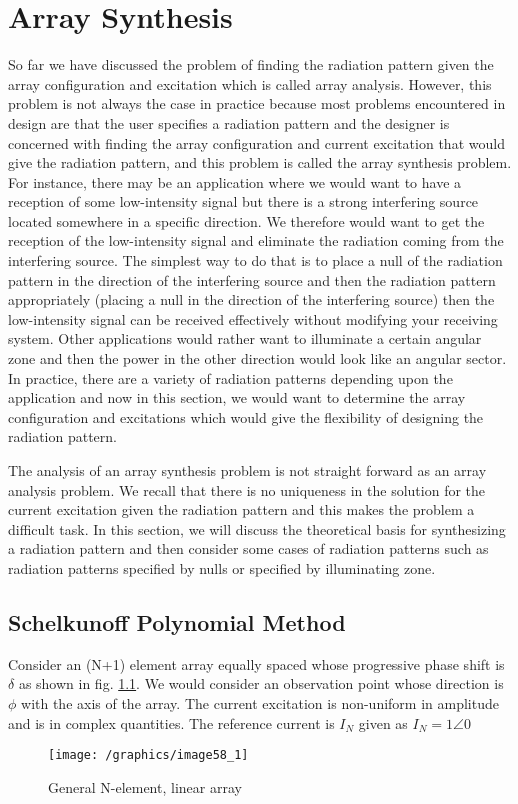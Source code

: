 \chapter{Array Synthesis}
So far we have discussed the problem of finding the radiation pattern given the array configuration and excitation which is called array analysis. However, this problem is not always the case in practice because most problems encountered in design are that the user specifies a radiation pattern and the designer is concerned with finding the array configuration and current excitation that would give the radiation pattern, and this problem is called the array synthesis problem. For instance, there may be an application where we would want to have a reception of some low-intensity signal but there is a strong interfering source located somewhere in a specific direction. We therefore would want to get the reception of the low-intensity signal and eliminate the radiation coming from the interfering source. The simplest way to do that is to place a null of the radiation pattern in the direction of the interfering source and then the radiation pattern appropriately (placing a null in the direction of the interfering source) then the low-intensity signal can be received effectively without modifying your receiving system. Other applications would rather want to illuminate a certain angular zone and then the power in the other direction would look like an angular sector. In practice, there are a variety of radiation patterns depending upon the application and now in this section, we would want to determine the array configuration and excitations which would give the flexibility of designing the radiation pattern.

The analysis of an array synthesis problem is not straight forward as an array analysis problem. We recall that there is no uniqueness in the solution for the current excitation given the radiation pattern and this makes the problem a difficult task. In this section, we will discuss the theoretical basis for synthesizing a radiation pattern and then consider some cases of radiation patterns such as radiation patterns specified by nulls or specified by illuminating zone.

\section{Schelkunoff Polynomial Method}
Consider an (N+1) element array equally spaced whose progressive phase shift is $\delta$ as shown in fig. \ref{fig:fig 55_1}. We would consider an observation point whose direction is $\phi$ with the axis of the array. The current excitation is non-uniform in amplitude and is in complex quantities. The reference current is $I_{N}$ given as $I_{N}=1\angle 0$
\begin{figure}[h]
\centering
\texttt{[image: /graphics/image58\_1]}
\caption{ General N-element, linear array}
\label{fig:fig 55_1}
\end{figure}

